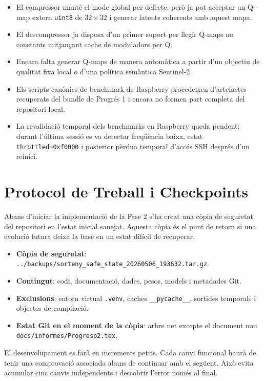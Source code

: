 \documentclass[11pt,a4paper]{article}
\begin{document}
\begin{itemize}
  \item El compressor manté el mode global per defecte, però ja pot acceptar un Q-map extern \texttt{uint8} de $32 \times 32$ i generar latents coherents amb aquest mapa.
  \item El descompressor ja disposa d'un primer suport per llegir Q-maps no constants mitjançant cache de moduladors per Q.
  \item Encara falta generar Q-maps de manera automàtica a partir d'un objectiu de qualitat fixa local o d'una política semàntica Sentinel-2.
  \item Els scripts canònics de benchmark de Raspberry procedeixen d'artefactes recuperats del bundle de Progrés 1 i encara no formen part completa del repositori local.
  \item La revalidació temporal dels benchmarks en Raspberry queda pendent: durant l'última sessió es va detectar freqüència baixa, estat \texttt{throttled=0xf0000} i posterior pèrdua temporal d'accés SSH després d'un reinici.
\end{itemize}

\section{Protocol de Treball i Checkpoints}

Abans d'iniciar la implementació de la Fase 2 s'ha creat una còpia de seguretat del repositori en l'estat inicial sanejat. Aquesta còpia és el punt de retorn si una evolució futura deixa la base en un estat difícil de recuperar.

\begin{itemize}
  \item \textbf{Còpia de seguretat}: \texttt{../backups/sorteny\_safe\_state\_20260506\_193632.tar.gz}.
  \item \textbf{Contingut}: codi, documentació, dades, pesos, models i metadades Git.
  \item \textbf{Exclusions}: entorn virtual \texttt{.venv}, caches \texttt{\_\_pycache\_\_}, sortides temporals i objectes de compilació.
  \item \textbf{Estat Git en el moment de la còpia}: arbre net excepte el document nou \texttt{docs/informes/Progreso2.tex}.
\end{itemize}

El desenvolupament es farà en increments petits. Cada canvi funcional haurà de tenir una comprovació associada abans de continuar amb el següent. Això evita acumular cinc canvis independents i descobrir l'error només al final.
\end{document}
